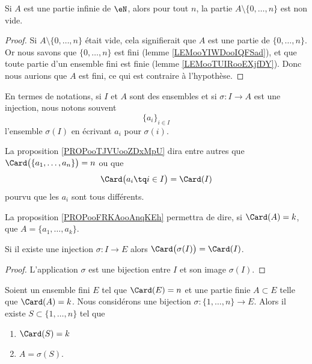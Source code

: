 \begin{lemma}       \label{LEMooRWUDooTgoRXH}
	Si \( A\) est une partie infinie de \( \eN\), alors pour tout \( n\), la partie \( A\setminus\{ 0,\ldots, n \}\) est non vide.
\end{lemma}

\begin{proof}
	Si \( A\setminus\{ 0,\ldots, n \}\) était vide, cela signifierait que \( A\) est une partie de \( \{ 0,\ldots, n \}\). Or nous savons que \( \{ 0,\ldots, n \}\) est fini (lemme \ref{LEMooYIWDooIQFSad}), et que toute partie d'un ensemble fini est finie (lemme \ref{LEMooTUIRooEXjfDY}). Donc nous aurions que \( A\) est fini, ce qui est contraire à l'hypothèse.
\end{proof}


\begin{normaltext}
	En termes de notations, si \( I\) et \( A\) sont des ensembles et si \(\sigma \colon I\to A  \) est une injection, nous notons souvent
	\begin{equation}
		\{ a_i \}_{i\in I}
	\end{equation}
	l'ensemble \( \sigma(I)\) en écrivant \( a_i\) pour \( \sigma(i)\).

	La proposition \ref{PROPooTJVUooZDxMpU} dira entre autres que \( \Card\big( \{ a_1,\ldots,a_n \} \big)=n\) ou que
	\begin{equation}
		\Card\big( a_i\tq i\in I \big)=\Card(I)
	\end{equation}
	pourvu que les \( a_i\) sont tous différents.

	La proposition \ref{PROPooFRKAooAnqKEh} permettra de dire, si \( \Card(A)=k\), que \( A=\{ a_1,\ldots,a_k \}\).
\end{normaltext}


\begin{proposition}	\label{PROPooTJVUooZDxMpU}
	Si il existe une injection \(\sigma \colon I\to E  \) alors \( \Card\big( \sigma(I) \big)=\Card(I)\).
\end{proposition}

\begin{proof}
	L'application \( \sigma\) est une bijection entre \( I\) et son image \( \sigma(I)\).
\end{proof}

\begin{proposition}	\label{PROPooFRKAooAnqKEh}
	Soient un ensemble fini \( E\) tel que \( \Card(E)=n\) et une partie finie \( A\subset E\) telle que \( \Card(A)=k\). Nous considérons une bijection \(\sigma \colon \{ 1,\ldots,n \}\to E  \). Alors il existe \( S\subset\{ 1,\ldots,n \}\) tel que
	\begin{enumerate}
		\item
		      \( \Card(S)=k\)
		\item
		      \( A=\sigma(S)\).
	\end{enumerate}
\end{proposition}

